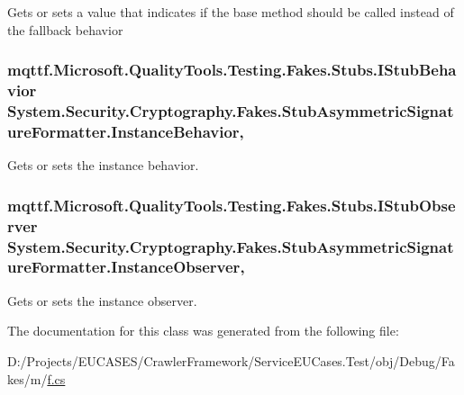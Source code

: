 Gets or sets a value that indicates if the base method should be called instead of the fallback behavior

\hypertarget{class_system_1_1_security_1_1_cryptography_1_1_fakes_1_1_stub_asymmetric_signature_formatter_a85e90791c41bf5522e731c95878e1e1d}{
\subsubsection[{Instance\-Behavior}]{\setlength{\rightskip}{0pt plus 5cm}mqttf.\-Microsoft.\-Quality\-Tools.\-Testing.\-Fakes.\-Stubs.\-I\-Stub\-Behavior System.\-Security.\-Cryptography.\-Fakes.\-Stub\-Asymmetric\-Signature\-Formatter.\-Instance\-Behavior\hspace{0.3cm}{\ttfamily [get]}, {\ttfamily [set]}}}\label{class_system_1_1_security_1_1_cryptography_1_1_fakes_1_1_stub_asymmetric_signature_formatter_a85e90791c41bf5522e731c95878e1e1d}


Gets or sets the instance behavior.

\hypertarget{class_system_1_1_security_1_1_cryptography_1_1_fakes_1_1_stub_asymmetric_signature_formatter_a0472c1d8277ee3a9638205cce643bbc7}{
\subsubsection[{Instance\-Observer}]{\setlength{\rightskip}{0pt plus 5cm}mqttf.\-Microsoft.\-Quality\-Tools.\-Testing.\-Fakes.\-Stubs.\-I\-Stub\-Observer System.\-Security.\-Cryptography.\-Fakes.\-Stub\-Asymmetric\-Signature\-Formatter.\-Instance\-Observer\hspace{0.3cm}{\ttfamily [get]}, {\ttfamily [set]}}}\label{class_system_1_1_security_1_1_cryptography_1_1_fakes_1_1_stub_asymmetric_signature_formatter_a0472c1d8277ee3a9638205cce643bbc7}


Gets or sets the instance observer.



The documentation for this class was generated from the following file\-:\begin{DoxyCompactItemize}
\item 
D\-:/\-Projects/\-E\-U\-C\-A\-S\-E\-S/\-Crawler\-Framework/\-Service\-E\-U\-Cases.\-Test/obj/\-Debug/\-Fakes/m/\hyperlink{m_2f_8cs}{f.\-cs}\end{DoxyCompactItemize}
